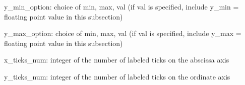 \begin{DoxyItemize}
\begin{DoxyItemize}
\begin{DoxyItemize}
\begin{DoxyItemize}
\begin{DoxyItemize}
\item y\+\_\+min\+\_\+option\+: choice of min, max, val (if val is specified, include y\+\_\+min = floating point value in this subsection)
\item y\+\_\+max\+\_\+option\+: choice of min, max, val (if val is specified, include y\+\_\+max = floating point value in this subsection)
\item x\+\_\+ticks\+\_\+num\+: integer of the number of labeled ticks on the abscissa axis
\item y\+\_\+ticks\+\_\+num\+: integer of the number of labeled ticks on the ordinate axis 
\end{DoxyItemize}
\end{DoxyItemize}
\end{DoxyItemize}
\end{DoxyItemize}
\end{DoxyItemize}